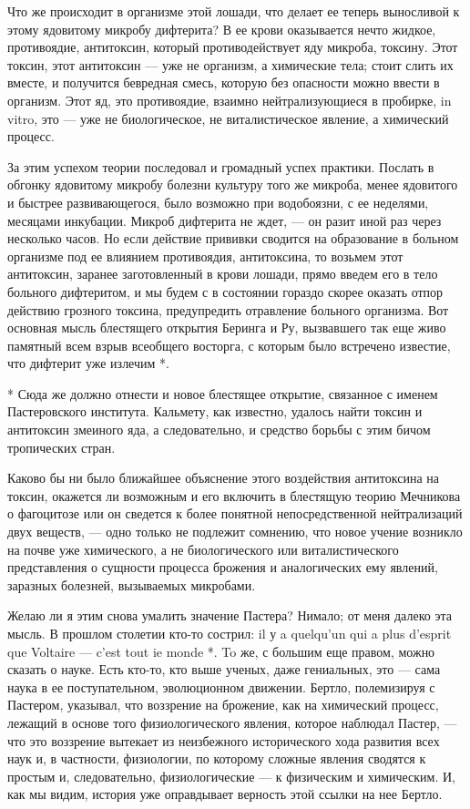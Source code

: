 Что же  происходит  в  организме  этой  лошади,  что  делает  ее  теперь
выносливой к этому ядовитому микробу  дифтерита? В ее крови  оказывается
нечто жидкое,  противоядие,  антитоксин,  который  противодействует  яду
микроба, токсину.  Этот токсин,  этот антитоксин  --- уже  не организм,  а
химические тела; стоит  слить их  вместе, и  получится бевредная  смесь,
которую без опасности можно ввести в организм. Этот яд, это противоядие,
взаимно  нейтрализующиеся  в   пробирке,  in   vitro,  это   ---  уже   не
биологическое, не виталистическое явление, а химический процесс.

За этим успехом теории последовал и громадный успех практики. Послать  в
обгонку ядовитому  микробу  болезни  культуру  того  же  микроба,  менее
ядовитого и быстрее развивающегося, было  возможно при водобоязни, с  ее
неделями, месяцами инкубации. Микроб дифтерита не ждет, --- он разит  иной
раз через  несколько  часов.  Но  если  действие  прививки  сводится  на
образование  в   больном   организме  под   ее   влиянием   противоядия,
антитоксина, то возьмем этот  антитоксин, заранее заготовленный в  крови
лошади, прямо введем  его в  тело больного дифтеритом,  и мы  будем с  в
состоянии  гораздо  скорее  оказать  отпор  действию  грозного  токсина,
предупредить  отравление   больного   организма.  Вот   основная   мысль
блестящего открытия Беринга и Ру, вызвавшего так еще живо памятный  всем
взрыв  всеобщего  восторга,  с  которым  было  встречено  известие,  что
дифтерит уже излечим *.

* Сюда же должно отнести и новое блестящее открытие, связанное с
именем Пастеровского института. Кальмету, как известно, удалось найти
токсин и антитоксин змеиного яда, а следовательно, и средство борьбы с
этим бичом тропических стран.

Каково бы ни было ближайшее объяснение этого воздействия антитоксина  на
токсин,  окажется  ли  возможным  и  его  включить  в  блестящую  теорию
Мечникова о фагоцитозе или он сведется к более понятной непосредственной
нейтрализаций двух  веществ, ---  одно только  не подлежит  сомнению,  что
новое учение возникло на почве уже химического, а не биологического  или
виталистического  представления   о   сущности   процесса   брожения   и
аналогических ему явлений, заразных болезней, вызываемых микробами.

Желаю ли я этим снова умалить  значение Пастера? Нимало; от меня  далеко
эта мысль. В  прошлом столетии кто-то  сострил: il у  a quelqu'un qui  a
plus d'esprit que Voltaire --- c'est tout ie monde *. To же, с большим еще
правом, можно  сказать  о науке.  Есть  кто-то, кто  выше  ученых,  даже
гениальных, это --- сама наука в ее поступательном, эволюционном движении.
Бертло, полемизируя с Пастером, указывал, что воззрение на брожение, как
на химический процесс, лежащий  в основе того физиологического  явления,
которое наблюдал Пастер,  --- что  это воззрение  вытекает из  неизбежного
исторического хода развития  всех наук  и, в  частности, физиологии,  по
которому  сложные   явления  сводятся   к  простым   и,   следовательно,
физиологические --- к физическим  и химическим. И,  как мы видим,  история
уже оправдывает верность этой ссылки на нее Бертло.

